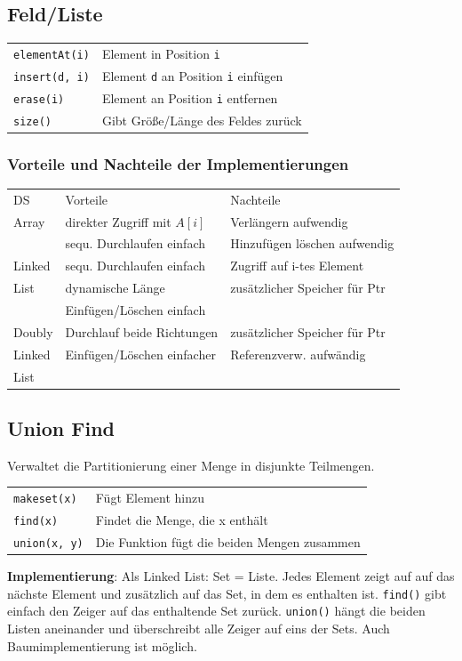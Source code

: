 \documentclass[fs, footer]{latex4ei}
\renewcommand{\t}{\texttt}
\begin{document}
\begin{multicols*}{4}
{{\subsection{Feld/Liste}
\begin{tabular}{ll}
\t{elementAt(i)}& Element in Position \t{i}\\
\t{insert(d, i)}& Element \t{d} an Position \t{i} einfügen\\
\t{erase(i)}& Element an Position \t{i} entfernen\\
\t{size()}& Gibt Größe/Länge des Feldes zurück\\

\end{tabular}

\subsubsection{Vorteile und Nachteile der Implementierungen}
\begin{tabular}{l|l|l}
DS & Vorteile & Nachteile \\
\brule
Array & direkter Zugriff mit $A[i]$ & Verlängern aufwendig \\
 & sequ. Durchlaufen einfach & Hinzufügen löschen aufwendig \\
\brule
Linked & sequ. Durchlaufen einfach & Zugriff auf i-tes Element\\
List & dynamische Länge & zusätzlicher Speicher für Ptr\\
 & Einfügen/Löschen einfach & \\
\brule
Doubly & Durchlauf beide Richtungen & zusätzlicher Speicher für Ptr\\
Linked & Einfügen/Löschen einfacher & Referenzverw. aufwändig\\
List & & \\
\end{tabular}

\subsection{Union Find}
Verwaltet die Partitionierung einer Menge in disjunkte Teilmengen.\\
\begin{tabular}{ll}
\t{makeset(x)}& Fügt Element hinzu\\
\t{find(x)}& Findet die Menge, die x enthält\\
\t{union(x, y)}& Die Funktion fügt die beiden Mengen zusammen\\
\end{tabular}
\textbf{Implementierung}: Als Linked List: Set = Liste. Jedes Element zeigt auf auf das nächste Element und zusätzlich auf das Set, in dem es enthalten ist. \t{find()} gibt einfach den Zeiger auf das enthaltende Set zurück. \t{union()} hängt die beiden Listen aneinander und überschreibt alle Zeiger auf eins der Sets. Auch Baumimplementierung ist möglich.

}}
\end{multicols*}
\end{document}
